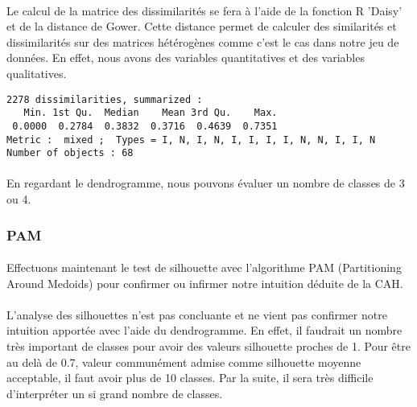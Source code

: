 \documentclass[11pt]{article}
\begin{document}
\paragraph{}
Le calcul de la matrice des dissimilarités se fera à l'aide de la
fonction R 'Daisy' et de la distance de Gower. Cette distance permet de
calculer des similarités et dissimilarités sur des matrices hétérogènes
comme c'est le cas dans notre jeu de données. En effet, nous avons des
variables quantitatives et des variables qualitatives.



    
    \begin{verbatim}
2278 dissimilarities, summarized :
   Min. 1st Qu.  Median    Mean 3rd Qu.    Max. 
 0.0000  0.2784  0.3832  0.3716  0.4639  0.7351 
Metric :  mixed ;  Types = I, N, I, N, I, I, I, I, N, N, I, I, N 
Number of objects : 68
    \end{verbatim}

    


    \begin{center}
    \end{center}
    
    
\paragraph{}
En regardant le dendrogramme, nous pouvons évaluer un nombre de classes
de 3 ou 4.

    \subsubsection{PAM}\label{pam}

\paragraph{}
Effectuons maintenant le test de silhouette avec l'algorithme PAM
(Partitioning Around Medoids) pour confirmer ou infirmer notre intuition
déduite de la CAH.



    \begin{center}
    \end{center}
    
\paragraph{}    
L'analyse des silhouettes n'est pas concluante et ne vient pas confirmer
notre intuition apportée avec l'aide du dendrogramme. En effet, il
faudrait un nombre très important de classes pour avoir des valeurs
silhouette proches de 1. Pour être au delà de 0.7, valeur communément
admise comme silhouette moyenne acceptable, il faut avoir plus de 10
classes. Par la suite, il sera très difficile d'interpréter un si grand
nombre de classes.
\end{document}
